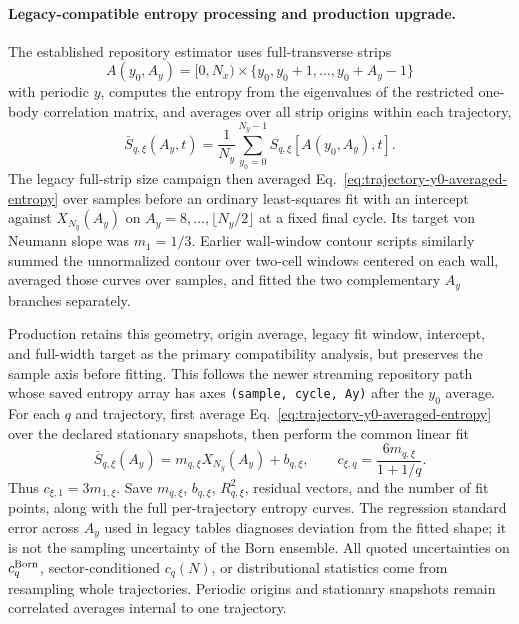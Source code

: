 \documentclass[aps,prx,onecolumn,nofootinbib,superscriptaddress,longbibliography]{revtex4-2}
\newcommand{\code}[1]{\texttt{#1}}
\begin{document}
\paragraph{Legacy-compatible entropy processing and production upgrade.}
The established repository estimator uses full-transverse strips
\begin{equation}
 A(y_0,A_y)=[0,N_x)\times\{y_0,y_0+1,\ldots,y_0+A_y-1\}
 \label{eq:legacy-strip-region}
\end{equation}
with periodic $y$, computes the entropy from the eigenvalues of the restricted one-body
correlation matrix, and averages over all strip origins within each trajectory,
\begin{equation}
 \bar S_{q,\xi}(A_y,t)=\frac1{N_y}\sum_{y_0=0}^{N_y-1}
 S_{q,\xi}\!\left[A(y_0,A_y),t\right].
 \label{eq:trajectory-y0-averaged-entropy}
\end{equation}
The legacy full-strip size campaign then averaged
Eq.~\eqref{eq:trajectory-y0-averaged-entropy} over samples before an ordinary
least-squares fit with an intercept against $X_{N_y}(A_y)$ on
$A_y=8,\ldots,\lfloor N_y/2\rfloor$ at a fixed final cycle.  Its target von Neumann
slope was $m_1=1/3$.  Earlier wall-window contour scripts similarly summed the
unnormalized contour over two-cell windows centered on each wall, averaged those curves
over samples, and fitted the two complementary $A_y$ branches separately.

Production retains this geometry, origin average, legacy fit window, intercept, and
full-width target as the primary compatibility analysis, but preserves the sample axis
before fitting.  This follows the newer streaming repository path whose saved entropy
array has axes \code{(sample, cycle, Ay)} after the $y_0$ average.  For each $q$ and
trajectory, first average Eq.~\eqref{eq:trajectory-y0-averaged-entropy} over the declared
stationary snapshots, then perform the common linear fit
\begin{equation}
 \bar S_{q,\xi}(A_y)=m_{q,\xi}X_{N_y}(A_y)+b_{q,\xi},
 \qquad
 c_{\xi,q}=\frac{6m_{q,\xi}}{1+1/q}.
 \label{eq:trajectory-central-charge-fit}
\end{equation}
Thus $c_{\xi,1}=3m_{1,\xi}$.  Save $m_{q,\xi}$, $b_{q,\xi}$, $R^2_{q,\xi}$, residual
vectors, and the number of fit points, along with the full per-trajectory entropy curves.
The regression standard error across $A_y$ used in legacy tables diagnoses deviation from
the fitted shape; it is not the sampling uncertainty of the Born ensemble.  All quoted
uncertainties on $c_q^{\rm Born}$, sector-conditioned $c_q(N)$, or distributional
statistics come from resampling whole trajectories.  Periodic origins and stationary
snapshots remain correlated averages internal to one trajectory.
\end{document}
